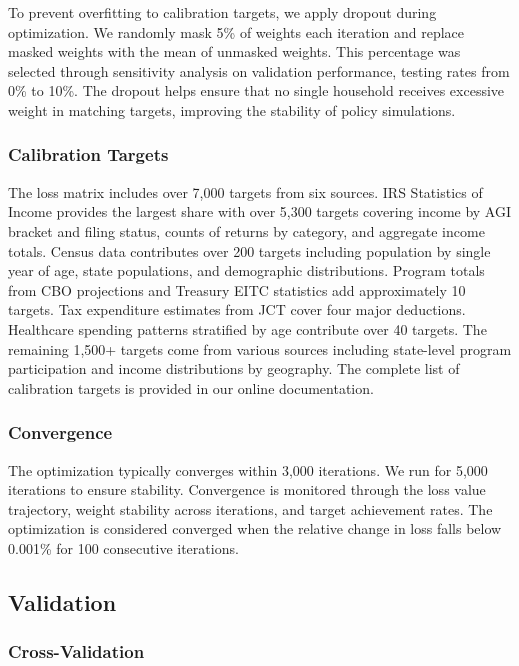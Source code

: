 To prevent overfitting to calibration targets, we apply dropout during optimization. We randomly mask 5\% of weights each iteration and replace masked weights with the mean of unmasked weights. This percentage was selected through sensitivity analysis on validation performance, testing rates from 0\% to 10\%. The dropout helps ensure that no single household receives excessive weight in matching targets, improving the stability of policy simulations.

\subsubsection{Calibration Targets}

The loss matrix includes over 7,000 targets from six sources. IRS Statistics of Income provides the largest share with over 5,300 targets covering income by AGI bracket and filing status, counts of returns by category, and aggregate income totals. Census data contributes over 200 targets including population by single year of age, state populations, and demographic distributions. Program totals from CBO projections and Treasury EITC statistics add approximately 10 targets. Tax expenditure estimates from JCT cover four major deductions. Healthcare spending patterns stratified by age contribute over 40 targets. The remaining 1,500+ targets come from various sources including state-level program participation and income distributions by geography. The complete list of calibration targets is provided in our online documentation.

\subsubsection{Convergence}

The optimization typically converges within 3,000 iterations. We run for 5,000 iterations to ensure stability. Convergence is monitored through the loss value trajectory, weight stability across iterations, and target achievement rates. The optimization is considered converged when the relative change in loss falls below 0.001\% for 100 consecutive iterations.

\subsection{Validation}

\subsubsection{Cross-Validation}

